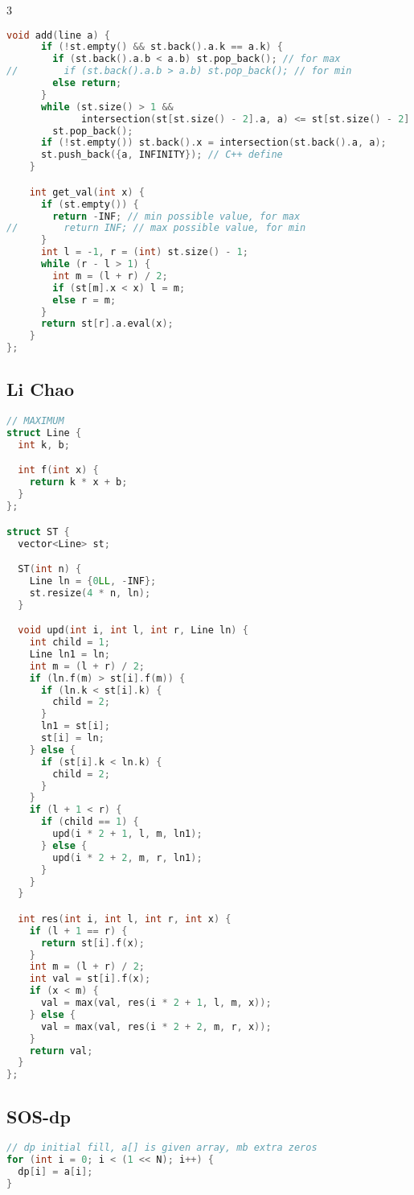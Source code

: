 \documentclass[9pt,a4paper,landscape,twosided]{extarticle}
\begin{document}
\begin{multicols*}{3}
\begin{lstlisting}[language=C++]
    void add(line a) {
      if (!st.empty() && st.back().a.k == a.k) {
        if (st.back().a.b < a.b) st.pop_back(); // for max
//        if (st.back().a.b > a.b) st.pop_back(); // for min
        else return;
      }
      while (st.size() > 1 &&
             intersection(st[st.size() - 2].a, a) <= st[st.size() - 2].x)
        st.pop_back();
      if (!st.empty()) st.back().x = intersection(st.back().a, a);
      st.push_back({a, INFINITY}); // C++ define
    }

    int get_val(int x) {
      if (st.empty()) {
        return -INF; // min possible value, for max
//        return INF; // max possible value, for min
      }
      int l = -1, r = (int) st.size() - 1;
      while (r - l > 1) {
        int m = (l + r) / 2;
        if (st[m].x < x) l = m;
        else r = m;
      }
      return st[r].a.eval(x);
    }
};
\end{lstlisting}

\subsection{Li Chao}
\begin{lstlisting}[language=C++]
// MAXIMUM
struct Line {
  int k, b;

  int f(int x) {
    return k * x + b;
  }
};

struct ST {
  vector<Line> st;

  ST(int n) {
    Line ln = {0LL, -INF};
    st.resize(4 * n, ln);
  }

  void upd(int i, int l, int r, Line ln) {
    int child = 1;
    Line ln1 = ln;
    int m = (l + r) / 2;
    if (ln.f(m) > st[i].f(m)) {
      if (ln.k < st[i].k) {
        child = 2;
      }
      ln1 = st[i];
      st[i] = ln;
    } else {
      if (st[i].k < ln.k) {
        child = 2;
      }
    }
    if (l + 1 < r) {
      if (child == 1) {
        upd(i * 2 + 1, l, m, ln1);
      } else {
        upd(i * 2 + 2, m, r, ln1);
      }
    }
  }

  int res(int i, int l, int r, int x) {
    if (l + 1 == r) {
      return st[i].f(x);
    }
    int m = (l + r) / 2;
    int val = st[i].f(x);
    if (x < m) {
      val = max(val, res(i * 2 + 1, l, m, x));
    } else {
      val = max(val, res(i * 2 + 2, m, r, x));
    }
    return val;
  }
};
\end{lstlisting}

\subsection{SOS-dp}
\begin{lstlisting}[language=C++]
// dp initial fill, a[] is given array, mb extra zeros
for (int i = 0; i < (1 << N); i++) {
  dp[i] = a[i];
}


\end{lstlisting}
\end{multicols*}
\end{document}
